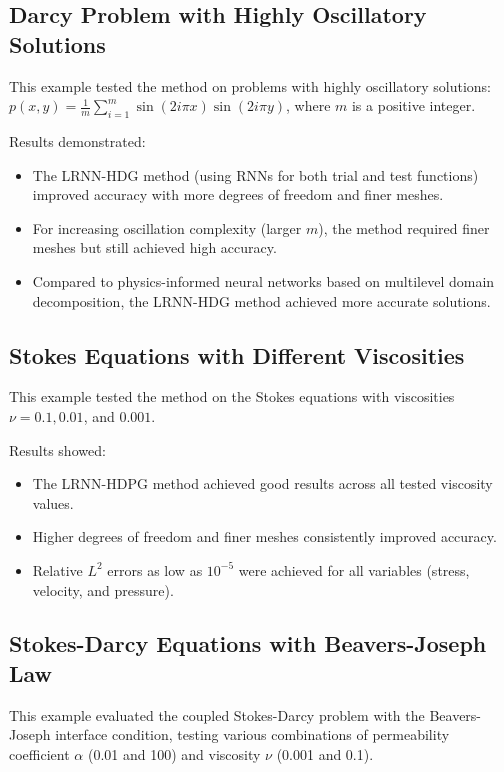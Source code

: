 \documentclass[11pt,a4paper]{article}
\begin{document}
\subsection{Darcy Problem with Highly Oscillatory Solutions}

This example tested the method on problems with highly oscillatory solutions:
$p(x,y) = \frac{1}{m}\sum_{i=1}^{m}\sin(2i\pi x)\sin(2i\pi y)$, where $m$ is a positive integer.

Results demonstrated:
\begin{itemize}
    \item The LRNN-HDG method (using RNNs for both trial and test functions) improved accuracy with more degrees of freedom and finer meshes.
    \item For increasing oscillation complexity (larger $m$), the method required finer meshes but still achieved high accuracy.
    \item Compared to physics-informed neural networks based on multilevel domain decomposition, the LRNN-HDG method achieved more accurate solutions.
\end{itemize}

\subsection{Stokes Equations with Different Viscosities}

This example tested the method on the Stokes equations with viscosities $\nu = 0.1, 0.01$, and $0.001$.

Results showed:
\begin{itemize}
    \item The LRNN-HDPG method achieved good results across all tested viscosity values.
    \item Higher degrees of freedom and finer meshes consistently improved accuracy.
    \item Relative $L^2$ errors as low as $10^{-5}$ were achieved for all variables (stress, velocity, and pressure).
\end{itemize}

\subsection{Stokes-Darcy Equations with Beavers-Joseph Law}

This example evaluated the coupled Stokes-Darcy problem with the Beavers-Joseph interface condition, testing various combinations of permeability coefficient $\alpha$ (0.01 and 100) and viscosity $\nu$ (0.001 and 0.1).
\end{document}
